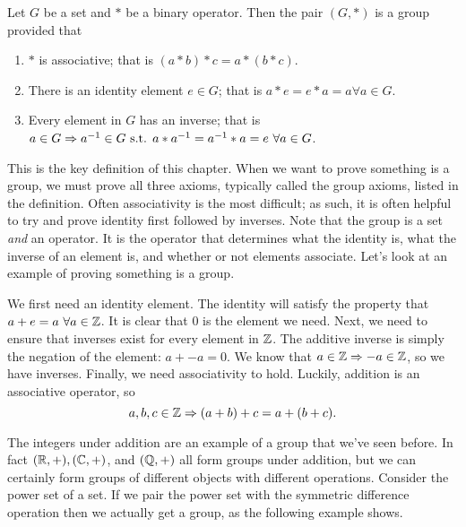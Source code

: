 \begin{definition}{}
	Let $G$ be a set and $*$ be a binary operator. Then the pair $(G,*)$ is a group provided that
	\begin{enumerate}
		\item $*$ is associative; that is $(a*b)*c=a*(b*c)$.
		\item There is an identity element $e\in G$; that is $a*e=e*a=a \forall a\in G$.
		\item Every element in $G$ has an inverse; that is $a\in G\Rightarrow a^{-1}\in G \text{ s.t. } a*a^{-1}=a^{-1}*a=e\ \forall a\in G$.
	\end{enumerate}
\end{definition}
This is the key definition of this chapter.
When we want to prove something is a group, we must prove all three axioms, typically called the group axioms, listed in the definition.
Often associativity is the most difficult; as such, it is often helpful to try and prove identity first followed by inverses.
Note that the group is a set \textit{and} an operator.
It is the operator that determines what the identity is, what the inverse of an element is, and whether or not elements associate.
Let's look at an example of proving something is a group.

\begin{example}{}
    We first need an identity element. The identity will satisfy the property that $a+e=a\ \forall a\in\mathbb{Z}$. It is clear that 0 is the element we need.
    Next, we need to ensure that inverses exist for every element in $\mathbb{Z}$. The additive inverse is simply the negation of the element: $a+-a=0$. We know that $a\in\mathbb{Z}\Rightarrow -a\in\mathbb{Z}$, so we have inverses.
    Finally, we need associativity to hold. Luckily, addition is an associative operator, so
    \[
        a,b,c\in\mathbb{Z}\Rightarrow (a+b)+c=a+(b+c).
    \]
\end{example}

The integers under addition are an example of a group that we've seen before.
In fact $(\mathbb{R},+), (\mathbb{C},+)$, and $(\mathbb{Q},+)$ all form groups under addition, but we can certainly form groups of different objects with different operations.
Consider the power set of a set.
If we pair the power set with the symmetric difference operation then we actually get a group, as the following example shows.

